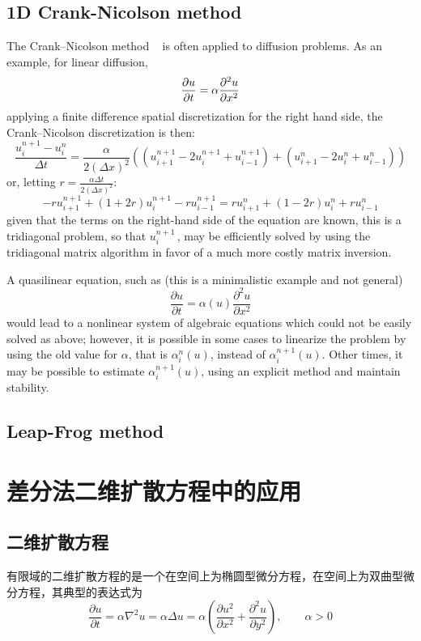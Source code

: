 \subsection{1D Crank-Nicolson method} 
The Crank–Nicolson method ~\cite{Wiki-Crank-Nicolson-Method} is often applied to diffusion problems. As an example, for linear diffusion,
$$ {\partial u \over \partial t}=\alpha {\frac  {\partial ^{2}u}{\partial x^{2}}} $$
applying a finite difference spatial discretization for the right hand side, the Crank–Nicolson discretization is then:
$${\frac{u_{i}^{n+1}-u_{i}^{n}}{\Delta t}}={\frac{\alpha}{2(\Delta x)^{2}}}((u_{i+1}^{n+1}-2u_{i}^{n+1}+u_{i-1}^{n+1})+(u_{i+1}^{n}-2u_{i}^{n}+u_{i-1}^{n}))$$
or, letting ${\displaystyle r={\frac {\alpha \Delta t}{2(\Delta x)^{2}}}}$:
$$-ru_{{i+1}}^{{n+1}}+(1+2r)u_{{i}}^{{n+1}}-ru_{{i-1}}^{{n+1}}=ru_{{i+1}}^{{n}}+(1-2r)u_{{i}}^{{n}}+ru_{{i-1}}^{{n}}$$
given that the terms on the right-hand side of the equation are known, this is a tridiagonal problem, so that ${\displaystyle u_{i}^{n+1}\,}$, may be efficiently solved by using the tridiagonal matrix algorithm in favor of a much more costly matrix inversion.

A quasilinear equation, such as (this is a minimalistic example and not general)
$${\frac  {\partial u}{\partial t}}=\alpha(u){\frac  {\partial ^{2}u}{\partial x^{2}}}$$
would lead to a nonlinear system of algebraic equations which could not be easily solved as above; however, it is possible in some cases to linearize the problem by using the old value for $\alpha$, that is $\alpha_{{i}}^{{n}}(u)$, instead of $ \alpha_{{i}}^{{n+1}}(u)$. Other times, it may be possible to estimate $\alpha_{{i}}^{{n+1}}(u)$, using an explicit method and maintain stability.

\subsection{Leap-Frog method}



\section{差分法二维扩散方程中的应用}

\subsection{二维扩散方程}

有限域的二维扩散方程的是一个在空间上为椭圆型微分方程，在空间上为双曲型微分方程，其典型的表达式为
$$ \frac{\partial u}{\partial t} = \alpha \nabla ^2 u = \alpha \Delta u = \alpha (\frac{\partial u^2}{\partial x^2}+\frac{\partial ^2 u}{\partial y^2}),\qquad \alpha>0 $$

